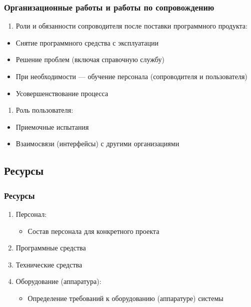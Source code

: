\documentclass{../industrial-development}
\begin{document}
\begin{frame} \frametitle{Организационные работы и работы по сопровождению}
	\begin{enumerate}[2] \item Роли и обязанности сопроводителя после поставки программного продукта:  \end{enumerate}
	\begin{itemize}
		\item Снятие программного средства с эксплуатации 
		\item Решение проблем (включая справочную службу) 
		\item При необходимости — обучение персонала (сопроводителя и пользователя) 
		\item Усовершенствование процесса
	\end{itemize}
		\begin{enumerate}[3]\item Роль пользователя: \end{enumerate}
	\begin{itemize}
		\item Приемочные испытания  
		\item Взаимосвязи (интерфейсы) с другими организациями
	\end{itemize}
\end{frame}

\lecturenotes


\subsection{Ресурсы}
\begin{frame} \frametitle{Ресурсы}
	\begin{enumerate} \item Персонал:  
	\begin{itemize}
		\item Состав персонала для конкретного проекта 
	\end{itemize}
		\item Программные средства 
		\item Технические средства
		\item Оборудование (аппаратура): 
	\begin{itemize}
		\item Определение требований к оборудованию (аппаратуре) системы 
	\end{itemize}
	\end{enumerate}
\end{frame}
\end{document}
